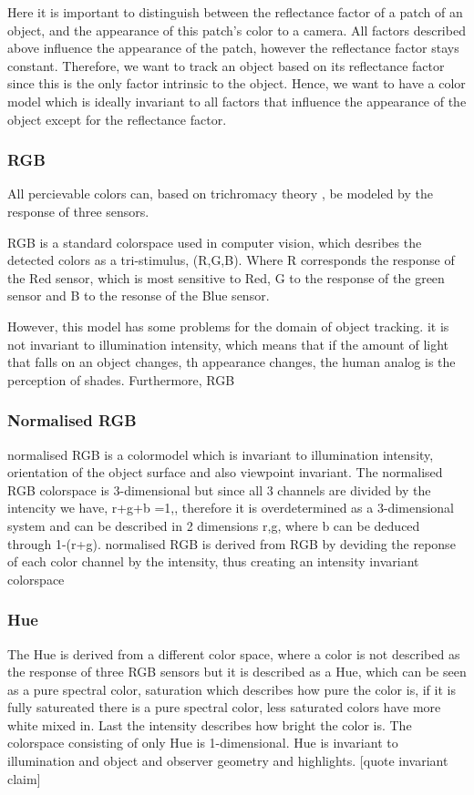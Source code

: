 \documentclass[a4paper,11pt]{article}
\begin{document}
Here it is important to distinguish between the reflectance factor of a patch of an object, and the appearance of this patch's color to a camera. All factors described above influence the appearance of the patch, however the reflectance factor stays constant. Therefore, we want to track an object based on its reflectance factor since this is the only factor intrinsic to the object.  Hence, we want to have a color model which is ideally invariant to all factors that influence the appearance of the object except for the reflectance factor.  

		\subsubsection{RGB}
		
		All percievable colors can, based on trichromacy theory  \cite{gevers_color}, be modeled by the response of three sensors. 
		
		RGB is a standard colorspace used in computer vision, which desribes the detected colors as a tri-stimulus, (R,G,B). Where R corresponds the response of the Red sensor, which is most sensitive to Red, G to the response of the green sensor and B to the resonse of the Blue sensor.

		However, this model has some problems for the domain of object tracking. it is not invariant to illumination intensity, which means that if the amount of light that falls on an object changes, th appearance changes, the human analog is the perception of shades. 
		Furthermore, RGB 
		

		

		\subsubsection{Normalised RGB}
		normalised RGB is a colormodel which is invariant to illumination intensity, orientation of the object surface and also viewpoint invariant. 
		The normalised RGB colorspace is 3-dimensional but since all 3 channels are divided by the intencity we have, r+g+b =1,, therefore it is overdetermined as a 3-dimensional system and can be described in 2 dimensions r,g, where b can be deduced through 1-(r+g).
		normalised RGB is derived from RGB by deviding the reponse of each color channel by the intensity, thus creating an intensity invariant colorspace
		\subsubsection{Hue}
		The Hue is derived from a different color space, where a color is not described as the response of three RGB sensors but it is described as a Hue, which can be seen as a pure spectral color, saturation which describes how pure the color is, if it is fully satureated there is a pure spectral color, less saturated colors have more white mixed in. Last the intensity describes how bright the color is. 
		The colorspace consisting of only Hue is 1-dimensional.
		Hue is invariant to illumination and object and observer geometry and highlights. [quote invariant claim]
\end{document}
